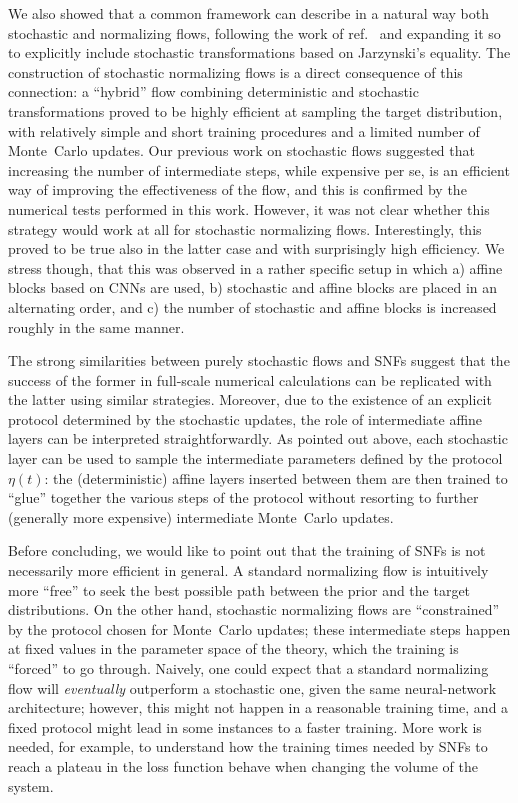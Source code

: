 \documentclass[11pt]{article}
\begin{document}
We also showed that a common framework can describe in a natural way both stochastic and normalizing flows, following the work of ref.~\cite{Wu:2020snf} and expanding it so to explicitly include stochastic transformations based on Jarzynski's equality. The construction of stochastic normalizing flows is a direct consequence of this connection: a ``hybrid'' flow combining deterministic and stochastic transformations proved to be highly efficient at sampling the target distribution, with relatively simple and short training procedures and a limited number of Monte~Carlo updates. Our previous work on stochastic flows suggested that increasing the number of intermediate steps, while expensive per se, is an efficient way of improving the effectiveness of the flow, and this is confirmed by the numerical tests performed in this work. However, it was not clear whether this strategy would work at all for stochastic normalizing flows. Interestingly, this proved to be true also in the latter case and with surprisingly high efficiency. We stress though, that this was observed in a rather specific setup in which a) affine blocks based on CNNs are used, b) stochastic and affine blocks are placed in an alternating order, and c) the number of stochastic and affine blocks is increased roughly in the same manner.

The strong similarities between purely stochastic flows and SNFs suggest that the success of the former in full-scale numerical calculations can be replicated with the latter using similar strategies. Moreover, due to the existence of an explicit protocol determined by the stochastic updates, the role of intermediate affine layers can be interpreted straightforwardly. As pointed out above, each stochastic layer can be used to sample the intermediate parameters defined by the protocol $\eta(t)$: the (deterministic) affine layers inserted between them are then trained to ``glue'' together the various steps of the protocol without resorting to further (generally more expensive) intermediate Monte~Carlo updates. 

Before concluding, we would like to point out that the training of SNFs is not necessarily more efficient in general. A standard normalizing flow is intuitively more ``free'' to seek the best possible path between the prior and the target distributions. On the other hand, stochastic normalizing flows are ``constrained'' by the protocol chosen for Monte~Carlo updates; these intermediate steps happen at fixed values in the parameter space of the theory, which the training is ``forced'' to go through. Naively, one could expect that a standard normalizing flow will \emph{eventually} outperform a stochastic one, given the same neural-network architecture; however, this might not happen in a reasonable training time, and a fixed protocol might lead in some instances to a faster training. More work is needed, for example, to understand how the training times needed by SNFs to reach a plateau in the loss function behave when changing the volume of the system.
\end{document}
